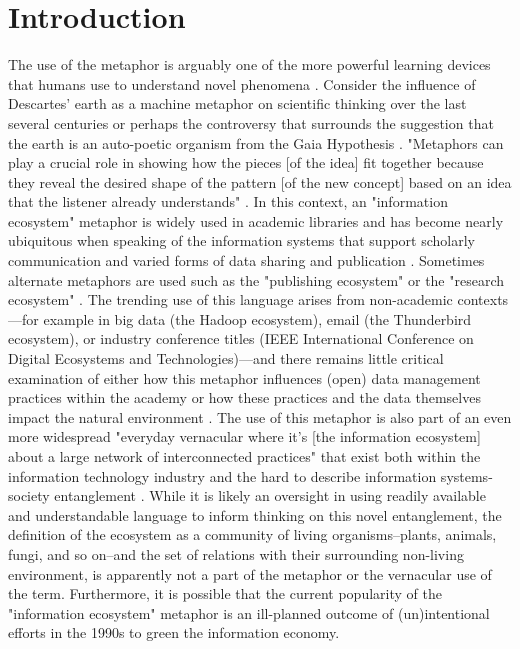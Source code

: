 \section{Introduction}

The use of the metaphor is arguably one of the more powerful learning devices that humans use to understand novel phenomena \cite{livingstone_1981, anderson_2016}. Consider the influence of Descartes' earth as a machine metaphor on scientific thinking over the last several centuries \cite{abram_1991} or perhaps the controversy that surrounds the suggestion that the earth is an auto-poetic organism from the Gaia Hypothesis \cite{lovelock_1974}. "Metaphors can play a crucial role in showing how the pieces [of the idea] fit together because they reveal the desired shape of the pattern [of the new concept] based on an idea that the listener already understands" \cite{anderson_2016}. In this context, an "information ecosystem" metaphor is widely used in academic libraries and has become nearly ubiquitous when speaking of the information systems that support scholarly communication and varied forms of data sharing and publication \cite[for example see]{walter_2008}. Sometimes alternate metaphors are used such as the "publishing ecosystem" or the "research ecosystem" \cite[for respective examples see]{esposito_2013,dylla_2016}. The trending use of this language arises from non-academic contexts—for example in big data (the Hadoop ecosystem), email (the Thunderbird ecosystem), or industry conference titles (IEEE International Conference on Digital Ecosystems and Technologies)—and there remains little critical examination of either how this metaphor influences (open) data management practices within the academy or how these practices and the data themselves impact the natural environment \cite[although see][]{stepp_1999}. The use of this metaphor is also part of an even more widespread "everyday vernacular where it’s [the information ecosystem] about a large network of interconnected practices" that exist both within the information technology industry and the hard to describe information systems-society entanglement \cite{boyd_2016}. While it is likely an oversight in using readily available and understandable language to inform thinking on this novel entanglement, the definition of the ecosystem as a community of living organisms--plants, animals, fungi, and so on--and the set of relations with their surrounding non-living environment, is apparently not a part of the metaphor or the vernacular use of the term. Furthermore, it is possible that the current popularity of the "information ecosystem" metaphor is an ill-planned outcome of (un)intentional efforts in the 1990s to green the information economy.

